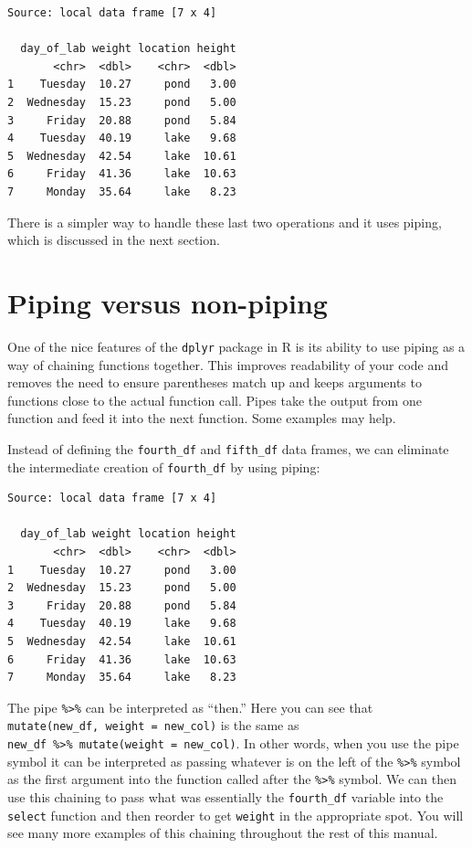 \documentclass[twoside, 12pt]{article}
\newenvironment{Shaded}{\begin{snugshade}}{\end{snugshade}}
\newcommand{\KeywordTok}[1]{\textcolor[rgb]{0.13,0.29,0.53}{\textbf{{#1}}}}
\newcommand{\DataTypeTok}[1]{\textcolor[rgb]{0.13,0.29,0.53}{{#1}}}
\newcommand{\StringTok}[1]{\textcolor[rgb]{0.31,0.60,0.02}{{#1}}}
\newcommand{\NormalTok}[1]{{#1}}
\newcommand{\nonumsection}[1]{
  \addtocontents{toc}{\protect\setcounter{tocdepth}{-1}}
  \section{#1}
  \addtocontents{toc}{\protect\setcounter{tocdepth}{1}}
}
\begin{document}
\begin{Verbatim}[frame=single]
Source: local data frame [7 x 4]

  day_of_lab weight location height
       <chr>  <dbl>    <chr>  <dbl>
1    Tuesday  10.27     pond   3.00
2  Wednesday  15.23     pond   5.00
3     Friday  20.88     pond   5.84
4    Tuesday  40.19     lake   9.68
5  Wednesday  42.54     lake  10.61
6     Friday  41.36     lake  10.63
7     Monday  35.64     lake   8.23
\end{Verbatim}

There is a simpler way to handle these last two operations and it uses
piping, which is discussed in the next section.

\nonumsection{Piping versus non-piping}

One of the nice features of the \texttt{dplyr} package in R is its
ability to use piping as a way of chaining functions together. This
improves readability of your code and removes the need to ensure
parentheses match up and keeps arguments to functions close to the
actual function call. Pipes take the output from one function and feed
it into the next function. Some examples may help.

Instead of defining the \texttt{fourth\_df} and \texttt{fifth\_df} data
frames, we can eliminate the intermediate creation of
\texttt{fourth\_df} by using piping:

\begin{Shaded}
\end{Shaded}

\begin{Verbatim}[frame=single]
Source: local data frame [7 x 4]

  day_of_lab weight location height
       <chr>  <dbl>    <chr>  <dbl>
1    Tuesday  10.27     pond   3.00
2  Wednesday  15.23     pond   5.00
3     Friday  20.88     pond   5.84
4    Tuesday  40.19     lake   9.68
5  Wednesday  42.54     lake  10.61
6     Friday  41.36     lake  10.63
7     Monday  35.64     lake   8.23
\end{Verbatim}

The pipe \texttt{\%\textgreater{}\%} can be interpreted as ``then.''
Here you can see that \texttt{mutate(new\_df,\ weight\ =\ new\_col)} is
the same as
\texttt{new\_df\ \%\textgreater{}\%\ mutate(weight\ =\ new\_col)}. In
other words, when you use the pipe symbol it can be interpreted as
passing whatever is on the left of the \texttt{\%\textgreater{}\%}
symbol as the first argument into the function called after the
\texttt{\%\textgreater{}\%} symbol. We can then use this chaining to
pass what was essentially the \texttt{fourth\_df} variable into the
\texttt{select} function and then reorder to get \texttt{weight} in the
appropriate spot. You will see many more examples of this chaining
throughout the rest of this manual.
\end{document}
